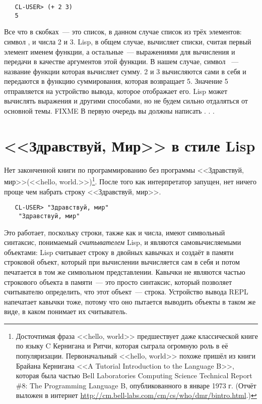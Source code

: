 \begin{verbatim}
   CL-USER> (+ 2 3)
   5
\end{verbatim}

Все что в скобках~--- это список, в данном случае список из трёх элементов: символ \code{+},
и числа 2 и 3. Lisp, в общем случае, вычисляет списки, считая первый элемент именем
функции, а остальные~--- выражениями для вычисления и передачи в качестве аргументов этой
функции. В нашем случае, символ \code{+}~--- название функции которая вычисляет сумму. 2 и 3
вычисляются сами в себя и передаются в функцию суммирования, которая возвращает
5. Значение 5 отправляется на устройство вывода, которое отображает его. Lisp может
вычислять выражения и другими способами, но не будем сильно отдаляться от основной
темы. FIXME В первую очередь вы должны написать . . .

\section{<<Здравствуй, Мир>> в стиле Lisp}

Нет законченной книги по программированию без программы <<Здравствуй, мир>>(<<hello,
world.>>)\footnote{Досточтимая фраза <<hello, world>> предшествует даже классической книге по
  языку C Кернигана и Ритчи, которая сыграла огромную роль в её
  популяризации. Первоначальный <<hello, world>> похоже пришёл из книги Брайана Кернигана <<A
  Tutorial Introduction to the Language B>>, которая была частью Bell Laboratories
  Computing Science Technical Report \#8: The Programming Language B, опубликованного в
  январе 1973 г. (Отчёт выложен в интернет
  \url{http://cm.bell-labs.com/cm/cs/who/dmr/bintro.html}.) }. После того как
интерпретатор запущен, нет ничего проще чем набрать строку <<Здравствуй, мир>>.

\begin{verbatim}
   CL-USER> "Здравствуй, мир"
    "Здравствуй, мир"
\end{verbatim}

Это работает, поскольку строки, также как и числа, имеют символьный синтаксис, понимаемый
\textit{считывателем} Lisp, и являются самовычисляемыми объектами: Lisp считывает строку в
двойных кавычках и создаёт в памяти строковой объект, который при вычислении вычисляется
сам в себя и потом печатается в том же символьном представлении. Кавычки не являются
частью строкового объекта в памяти~--- это просто синтаксис, который позволяет считывателю
определить, что этот объект~--- строка. Устройство вывода REPL напечатает кавычки тоже,
потому что оно пытается выводить объекты в таком же виде, в каком понимает их считыватель.

